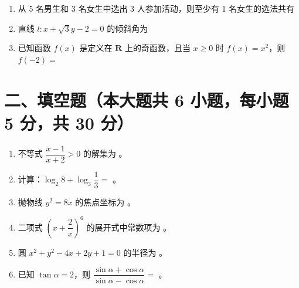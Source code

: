 \documentclass[zihao=-4,a4paper]{ctexart}
\begin{document}
\begin{enumerate}[label=\textbf{\arabic*.}, itemsep=6pt]
  \item 从 5 名男生和 3 名女生中选出 3 人参加活动，则至少有 1 名女生的选法共有

  \item 直线 $l\colon x + \sqrt{3}y - 2 = 0$ 的倾斜角为

  \item 已知函数 $f(x)$ 是定义在 $\mathbf{R}$ 上的奇函数，且当 $x \geq 0$ 时 $f(x) = x^2$，则 $f(-2) =$
\end{enumerate}

\section*{二、填空题（本大题共 6 小题，每小题 5 分，共 30 分）}

\begin{enumerate}[label=\textbf{\arabic*.}, itemsep=8pt]
  \item 不等式 $\dfrac{x - 1}{x + 2} > 0$ 的解集为 \underline{\hspace{2.5cm}}。
  \item 计算：$\log_2 8 + \log_3 \dfrac{1}{3} = $ \underline{\hspace{2.5cm}}。
  \item 抛物线 $y^2 = 8x$ 的焦点坐标为 \underline{\hspace{2.5cm}}。
  \item 二项式 $\left(x + \dfrac{2}{x}\right)^6$ 的展开式中常数项为 \underline{\hspace{2.5cm}}。
  \item 圆 $x^2 + y^2 - 4x + 2y + 1 = 0$ 的半径为 \underline{\hspace{2.5cm}}。
  \item 已知 $\tan\alpha = 2$，则 $\dfrac{\sin\alpha + \cos\alpha}{\sin\alpha - \cos\alpha} = $ \underline{\hspace{2.5cm}}。
\end{enumerate}
\end{document}
